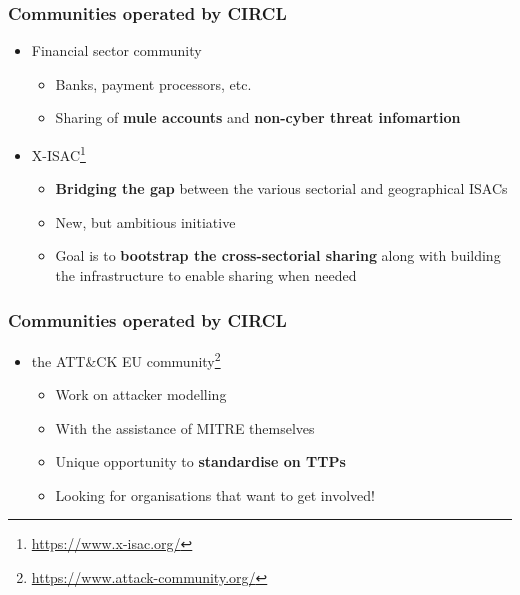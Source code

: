 \begin{frame}
\frametitle{Communities operated by CIRCL}
\begin{itemize}
	\item Financial sector community
	\begin{itemize}
		\item Banks, payment processors, etc.
		\item Sharing of {\bf mule accounts} and {\bf non-cyber threat infomartion}
	\end{itemize}
    \item X-ISAC\footnote{\url{https://www.x-isac.org/}}
	\begin{itemize}
		\item {\bf Bridging the gap} between the various sectorial and geographical ISACs
		\item New, but ambitious initiative
		\item Goal is to {\bf bootstrap the cross-sectorial sharing} along with building the infrastructure to enable sharing when needed
	\end{itemize}
\end{itemize}
\end{frame}

\begin{frame}
\frametitle{Communities operated by CIRCL}
\begin{itemize}
        \item the ATT\&CK EU community\footnote{\url{https://www.attack-community.org/}}
	\begin{itemize}
		\item Work on attacker modelling
		\item With the assistance of MITRE themselves
		\item Unique opportunity to {\bf standardise on TTPs}
		\item Looking for organisations that want to get involved!
	\end{itemize}
\end{itemize}
\end{frame}

